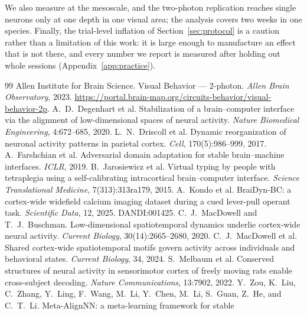 \documentclass{article}
\begin{document}
We also measure at the mesoscale, and the two-photon replication reaches single neurons only at one
depth in one visual area; the analysis covers two weeks in one species. Finally, the trial-level
inflation of Section~\ref{sec:protocol} is a caution rather than a limitation of this work: it is
large enough to manufacture an effect that is not there, and every number we report is measured
after holding out whole sessions (Appendix~\ref{app:practice}).

\begin{thebibliography}{99}
 Allen Institute for Brain Science.
Visual Behavior --- 2-photon. \emph{Allen Brain Observatory}, 2023.
\url{https://portal.brain-map.org/circuits-behavior/visual-behavior-2p}.
 A.~D.~Degenhart et al. Stabilization of a
brain--computer interface via the alignment of low-dimensional spaces of neural activity.
\emph{Nature Biomedical Engineering}, 4:672--685, 2020.
 L.~N.~Driscoll et al. Dynamic reorganization of
neuronal activity patterns in parietal cortex. \emph{Cell}, 170(5):986--999, 2017.
 A.~Farshchian et al. Adversarial domain
adaptation for stable brain--machine interfaces. \emph{ICLR}, 2019.
 B.~Jarosiewicz et al. Virtual typing by people
with tetraplegia using a self-calibrating intracortical brain--computer interface. \emph{Science
Translational Medicine}, 7(313):313ra179, 2015.
 A.~Kondo et al. BraiDyn-BC: a cortex-wide widefield calcium
imaging dataset during a cued lever-pull operant task. \emph{Scientific Data}, 12, 2025.
DANDI:001425.
 C.~J.~MacDowell and T.~J.~Buschman.
Low-dimensional spatiotemporal dynamics underlie cortex-wide neural activity. \emph{Current
Biology}, 30(14):2665--2680, 2020.
 C.~J.~MacDowell et al. Shared cortex-wide
spatiotemporal motifs govern activity across individuals and behavioral states. \emph{Current
Biology}, 34, 2024.
 S.~Melbaum et al. Conserved structures of neural
activity in sensorimotor cortex of freely moving rats enable cross-subject decoding. \emph{Nature
Communications}, 13:7902, 2022.
 Y.~Zou, K.~Liu, C.~Zhang, Y.~Ling, F.~Wang, M.~Li,
Y.~Chen, M.~Li, S.~Guan, Z.~He, and C.~T.~Li. Meta-AlignNN: a meta-learning framework for stable

\end{thebibliography}
\end{document}
